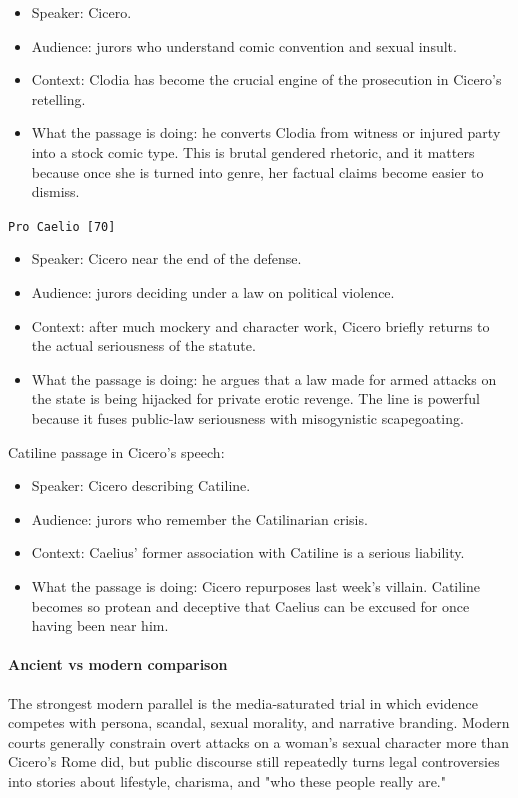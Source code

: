 \documentclass[11pt]{article}
\begin{document}
\begin{itemize}
\item Speaker: Cicero.
\item Audience: jurors who understand comic convention and sexual insult.
\item Context: Clodia has become the crucial engine of the prosecution in Cicero's retelling.
\item What the passage is doing: he converts Clodia from witness or injured party into a stock comic type. This is brutal gendered rhetoric, and it matters because once she is turned into genre, her factual claims become easier to dismiss.
\end{itemize}

\texttt{Pro Caelio [70]}

\begin{itemize}
\item Speaker: Cicero near the end of the defense.
\item Audience: jurors deciding under a law on political violence.
\item Context: after much mockery and character work, Cicero briefly returns to the actual seriousness of the statute.
\item What the passage is doing: he argues that a law made for armed attacks on the state is being hijacked for private erotic revenge. The line is powerful because it fuses public-law seriousness with misogynistic scapegoating.
\end{itemize}

Catiline passage in Cicero's speech:

\begin{itemize}
\item Speaker: Cicero describing Catiline.
\item Audience: jurors who remember the Catilinarian crisis.
\item Context: Caelius' former association with Catiline is a serious liability.
\item What the passage is doing: Cicero repurposes last week's villain. Catiline becomes so protean and deceptive that Caelius can be excused for once having been near him.
\end{itemize}

\paragraph{Ancient vs modern comparison}

The strongest modern parallel is the media-saturated trial in which evidence competes with persona, scandal, sexual morality, and narrative branding. Modern courts generally constrain overt attacks on a woman's sexual character more than Cicero's Rome did, but public discourse still repeatedly turns legal controversies into stories about lifestyle, charisma, and "who these people really are."
\end{document}
